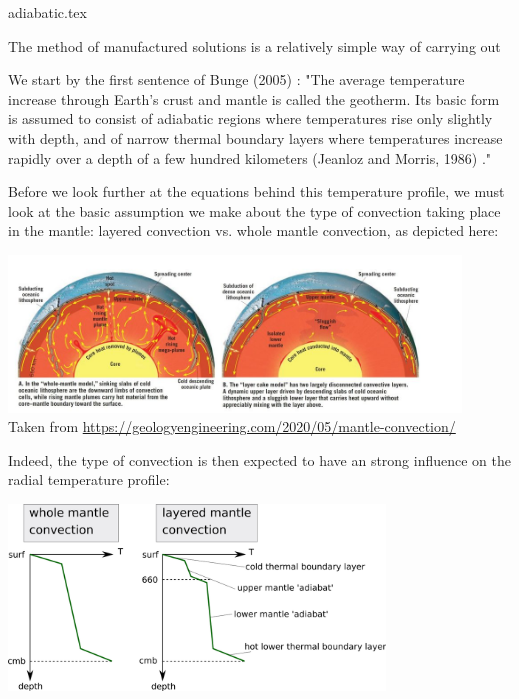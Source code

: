 \begin{flushright} {\tiny {\color{gray} adiabatic.tex}} \end{flushright}

The method of manufactured solutions is a relatively simple way of carrying out

We start by the first sentence of Bunge (2005) \cite{bung05}:
"The average temperature increase through Earth's
crust and mantle is called the geotherm. Its basic form is
assumed to consist of adiabatic regions where temperatures 
rise only slightly with depth, and of narrow thermal
boundary layers where temperatures increase rapidly
over a depth of a few hundred kilometers (Jeanloz and
Morris, 1986) \cite{jemo86}."

Before we look further at the equations behind this temperature profile, 
we must look at the basic assumption we make about
the type of convection taking place in the mantle:
layered convection vs. whole mantle convection, as
depicted here: 

\begin{center}
\includegraphics[width=12cm]{images/adiabatic/modes}\\
{\captionfont Taken from \url{https://geologyengineering.com/2020/05/mantle-convection/}}
\end{center}

\noindent Indeed, the type of convection is then expected to have an strong influence 
on the radial temperature profile: 

\begin{center}
\includegraphics[width=10cm]{images/adiabatic/drawing.png}
\end{center}

